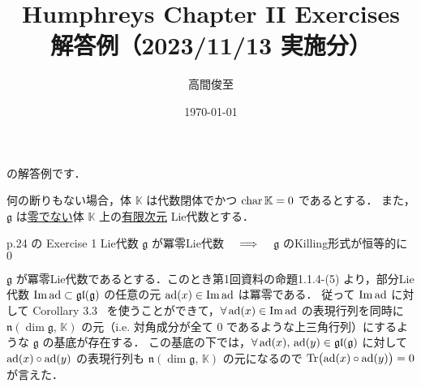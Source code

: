 \documentclass{ltjsarticle}
\makeatletter
\theoremstyle{mystyle} %
\renewcommand{\proofname}{証明}
\renewenvironment{proof}[1][\proofname]{\par
    \pushQED{\qed}%
    \normalfont \topsep6\p@\@plus6\p@\relax
    \trivlist
    \item[\hskip\labelsep
        \itshape
    \textbf{\underline{#1}}]\ignorespaces
}{%
    \popQED\endtrivlist\@endpefalse
}
\numberwithin{equation}{section}
\makeatother
\begin{document}
\title{Humphreys Chapter II Exercises \\ 解答例（2023/11/13 実施分）}
\author{高間俊至}
\date{\today}
\maketitle

\setcounter{section}{1}

\cite[p.24, Exercise1, 2]{Humphreys1972introduction}
の解答例です．

何の断りもない場合，体 $\mathbb{K}$ は代数閉体でかつ $\operatorname{char} \mathbb{K} = 0$ であるとする．
また，$\mathfrak{g}$ は\underline{零でない}体 $\mathbb{K}$ 上の\underline{有限次元} Lie代数とする．

\begin{myproblem}[label=ex:2-2-1]{p.24 の Exercise 1}
    Lie代数 $\mathfrak{g}$ が冪零Lie代数 $\quad \Longrightarrow \quad$ $\mathfrak{g}$ のKilling形式が恒等的に $0$
\end{myproblem}

\begin{proof}
    $\mathfrak{g}$ が冪零Lie代数であるとする．このとき第1回資料の命題1.1.4-(5) より，部分Lie代数 $\Im \operatorname{ad} \subset \mathfrak{gl} (\mathfrak{g})$ の任意の元 $\operatorname{ad}(x) \in \Im \operatorname{ad}$ は冪零である．
    従って $\Im \operatorname{ad}$ に対して Corollary 3.3~\cite[p.13]{Humphreys1972introduction} を使うことができて，$\forall \operatorname{ad}(x) \in \Im \operatorname{ad}$ の表現行列を同時に $\mathfrak{n}(\dim \mathfrak{g},\, \mathbb{K})$ の元（i.e. 対角成分が全て $0$ であるような上三角行列）にするような $\mathfrak{g}$ の基底が存在する．
    この基底の下では，$\forall \operatorname{ad}(x),\, \operatorname{ad}(y) \in \mathfrak{gl}(\mathfrak{g})$ に対して $\operatorname{ad}(x) \circ \operatorname{ad}(y)$ の表現行列も $\mathfrak{n}(\dim \mathfrak{g},\, \mathbb{K})$ の元になるので $\Tr \bigl( \operatorname{ad}(x) \circ \operatorname{ad}(y) \bigr) = 0$ が言えた．

\end{proof}
\end{document}
